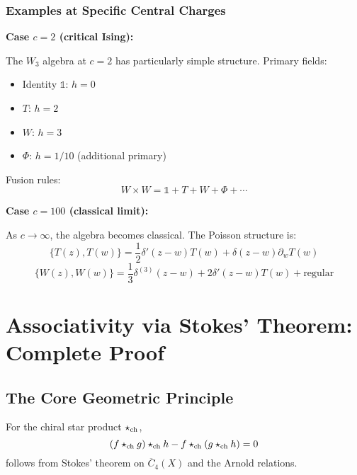 \subsubsection{Examples at Specific Central Charges}

\textbf{Case $c = 2$ (critical Ising):}

The $W_3$ algebra at $c=2$ has particularly simple structure. Primary fields:
\begin{itemize}
\item Identity $\mathbb{1}$: $h = 0$
\item $T$: $h = 2$
\item $W$: $h = 3$
\item $\Phi$: $h = 1/10$ (additional primary)
\end{itemize}

Fusion rules:
$$W \times W = \mathbb{1} + T + W + \Phi + \cdots$$

\textbf{Case $c = 100$ (classical limit):}

As $c \to \infty$, the algebra becomes classical. The Poisson structure is:
$$\{T(z), T(w)\} = \frac{1}{2}\delta'(z-w) T(w) + \delta(z-w)\partial_w T(w)$$
$$\{W(z), W(w)\} = \frac{1}{3}\delta^{(3)}(z-w) + 2\delta'(z-w)T(w) + \text{regular}$$

\section{Associativity via Stokes' Theorem: Complete Proof}
\label{sec:associativity-stokes}

\subsection{The Core Geometric Principle}

\begin{theorem}
\label{thm:associativity-stokes}
For the chiral star product $\star_{\text{ch}}$,
$$(f \star_{\text{ch}} g) \star_{\text{ch}} h - f \star_{\text{ch}} (g \star_{\text{ch}} h) = 0$$
follows from Stokes' theorem on $\overline{C}_4(X)$ and the Arnold relations.
\end{theorem}

